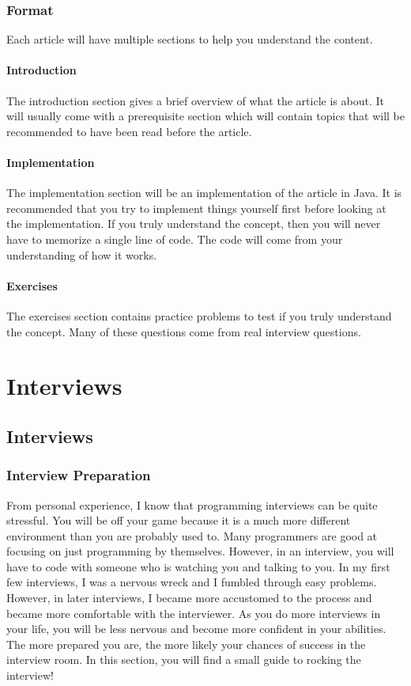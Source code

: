 \documentclass[11pt,oneside]{book}
\begin{document}
\subsection{Format}

Each article will have multiple sections to help you understand the content.

\subsubsection{Introduction}

The introduction section gives a brief overview of what the article is about. It will usually come with a prerequisite section which will contain topics that will be recommended to have been read before the article.

\subsubsection{Implementation}

The implementation section will be an implementation of the article in Java. It is recommended that you try to implement things yourself first before looking at the implementation. If you truly understand the concept, then you will never have to memorize a single line of code. The code will come from your understanding of how it works.

\subsubsection{Exercises}

The exercises section contains practice problems to test if you truly understand the concept. Many of these questions come from real interview questions.

\chapter{ Interviews }
    \section{ Interviews }
    \subsection{Interview Preparation}

From personal experience, I know that programming interviews can be quite stressful. You will be off your game because it is a much more different environment than you are probably used to. Many programmers are good at focusing on just programming by themselves. However, in an interview, you will have to code with someone who is watching you and talking to you. In my first few interviews, I was a nervous wreck and I fumbled through easy problems. However, in later interviews, I became more accustomed to the process and became more comfortable with the interviewer. As you do more interviews in your life, you will be less nervous and become more confident in your abilities. The more prepared you are, the more likely your chances of success in the interview room. In this section, you will find a small guide to rocking the interview!
\end{document}
